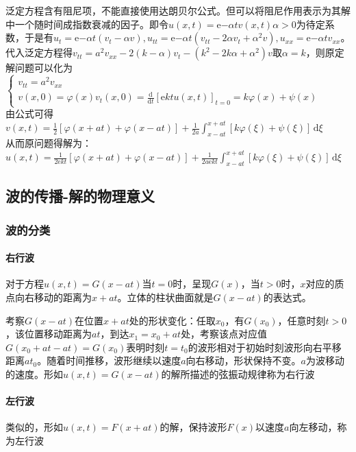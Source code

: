 \begin{enumerate}
    泛定方程含有阻尼项，不能直接使用达朗贝尔公式。但可以将阻尼作用表示为其解中一个随时间成指数衰减的因子。即令\(u(x,t)=\mathrm{e}{-\alpha t}v(x,t)\alpha>0\)为待定系数，于是有\(u_t=\mathrm{e}{-\alpha t}(v_t-\alpha v),u_{tt}=\mathrm{e}{-\alpha t}(v_{tt}-2\alpha v_t+\alpha^2v),u_{xx}=\mathrm{e}{-\alpha t}v_{xx}\)。代入泛定方程得\(v_{tt}=a^2v_{xx}-2(k-\alpha)v_t-(k^2-2k\alpha+\alpha^2)v\)取\(\alpha=k\)，则原定解问题可以化为\(\begin{cases}v_{tt}=a^2v_{xx}\\v(x,0)=\varphi(x)v_t(x,0)=\frac{\mathrm{d}}{\mathrm{d}t}[\mathrm{e}{kt}u(x,t)]_{t=0}=k\varphi(x)+\psi(x)\end{cases}\)\\
    由公式可得\(v(x,t)=\frac{1}{2}[\varphi(x+at)+\varphi(x-at)]+\frac{1}{2a}\int_{x-at}^{x+at}[k\varphi(\xi)+\psi(\xi)]\,\mathrm{d}\xi\)\\
    从而原问题得解为：\(u(x,t)=\frac{1}{2\mathrm{e}{kt}}[\varphi(x+at)+\varphi(x-at)]+\frac{1}{2a\mathrm{e}{kt}}\int_{x-at}^{x+at}[k\varphi(\xi)+\psi(\xi)]\,\mathrm{d}\xi\)
\end{enumerate}

\subsection{波的传播-解的物理意义}

\subsubsection{波的分类}

\paragraph{右行波}对于方程\(u(x,t)=G(x-at)\)当\(t=0\)时，呈现\(G(x)\)，当\(t>0\)时，\(x\)对应的质点向右移动的距离为\(x+at\)。立体的柱状曲面就是\(G(x-at)\)的表达式。

考察\(G(x-at)\)在位置\(x+at\)处的形状变化：任取\(x_0\)，有\(G(x_0)\)，任意时刻\(t>0\)，该位置移动距离为\(at\)，到达\(x_1=x_0+at\)处，考察该点对应值\(G(x_0+at-at)=G(x_0)\)表明时刻\(t=t_0\)的波形相对于初始时刻波形向右平移距离\(at_0\)。随着时间推移，波形继续以速度\(a\)向右移动，形状保持不变。\(a\)为波移动的速度。形如\(u(x,t)=G(x-at)\)的解所描述的弦振动规律称为右行波

\paragraph{左行波}类似的，形如\(u(x,t)=F(x+at)\)的解，保持波形\(F(x)\)以速度\(a\)向左移动，称为左行波

